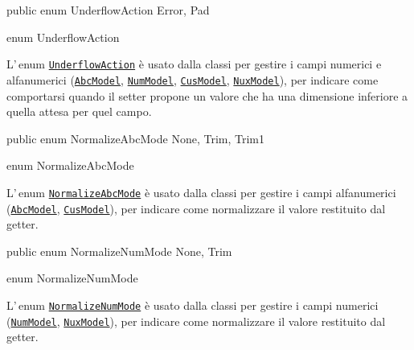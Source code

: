 \documentclass[a4paper,10pt]{report}
\newif\ifesource
\newenvironment{elisting}[1][!htb]
  {\captionsetup{aboveskip=0pt}\begin{listing}[#1]}
  {\end{listing}%
}
\begin{document}
\ifesource
\begin{lstlisting}[language=java, 
caption=enum UnderflowAction, 
label=lst:UnderflowAction]
public enum UnderflowAction { Error, Pad }
\end{lstlisting}\index{UnderflowAction}
\else
\begin{elisting}
\begin{javacode}
public enum UnderflowAction { Error, Pad }
\end{javacode}
\caption{enum UnderflowAction}\label{lst:UnderflowAction}
\end{elisting}
\fi
L'\,enum \hyperref[lst:UnderflowAction]{\texttt{UnderflowAction}} è usato dalla 
classi per gestire i campi numerici e alfanumerici 
(\hyperref[lst:AbcModel]{\texttt{AbcModel}},\break
\hyperref[lst:NumModel]{\texttt{NumModel}},
\hyperref[lst:CusModel]{\texttt{CusModel}},
\hyperref[lst:NuxModel]{\texttt{NuxModel}}), per indicare come comportarsi
quando il setter propone un valore che ha una dimensione inferiore a quella
attesa per quel campo.

\ifesource
\begin{lstlisting}[language=java, 
caption=enum NormalizeAbcMode, 
label=lst:NormalizeAbcMode]
public enum NormalizeAbcMode { None, Trim, Trim1 }
\end{lstlisting}\index{NormalizeAbcMode}
\else
\begin{elisting}
\begin{javacode}
public enum NormalizeAbcMode { None, Trim, Trim1 }
\end{javacode}
\caption{enum NormalizeAbcMode}\label{lst:NormalizeAbcMode}
\end{elisting}
\fi
L'\,enum \hyperref[lst:NormalizeAbcMode]{\texttt{NormalizeAbcMode}} è usato 
dalla classi per gestire i campi alfanumerici 
(\hyperref[lst:AbcModel]{\texttt{AbcModel}},
\hyperref[lst:CusModel]{\texttt{CusModel}}), per indicare come normalizzare
il valore restituito dal getter.

\ifesource
\begin{lstlisting}[language=java, 
caption=enum NormalizeNumMode, 
label=lst:NormalizeNumMode]
public enum NormalizeNumMode { None, Trim }
\end{lstlisting}\index{NormalizeNumMode}
\else
\begin{elisting}
\begin{javacode}
public enum NormalizeNumMode { None, Trim }
\end{javacode}
\caption{enum NormalizeNumMode}\label{lst:NormalizeNumMode}
\end{elisting}
\fi
L'\,enum \hyperref[lst:NormalizeNumMode]{\texttt{NormalizeNumMode}} è usato 
dalla classi per gestire i campi numerici 
(\hyperref[lst:NumModel]{\texttt{NumModel}},
\hyperref[lst:NuxModel]{\texttt{NuxModel}}), per indicare come normalizzare
il valore restituito dal getter.
\end{document}
